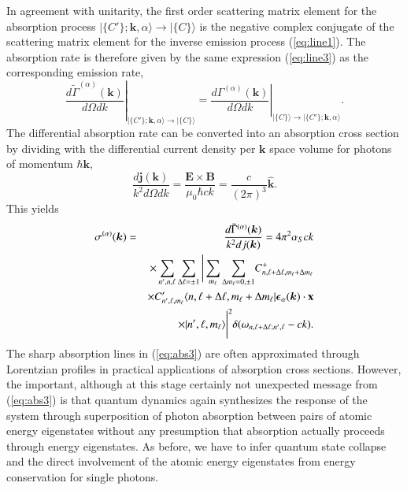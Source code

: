 \documentclass[final,3p,times,twocolumn]{elsarticle3}
\begin{document}
In agreement with unitarity, the first order scattering matrix element for the 
absorption process $\bm{|}\{C'\};\bm{k},\alpha\bm{\rangle}\to\bm{|}\{C\}\bm{\rangle}$
is the negative complex conjugate of the scattering matrix element for the 
inverse emission process (\ref{eq:line1}). The absorption rate is therefore 
given by the same expression (\ref{eq:line3}) as the corresponding emission rate,
\[
\left.\frac{d\tilde{\Gamma}^{(\alpha)}(\bm{k})}{d\Omega dk}
\right|_{\bm{|}\{C'\};\bm{k},\alpha\bm{\rangle}\to\bm{|}\{C\}\bm{\rangle}}
=\left.\frac{d\Gamma^{(\alpha)}(\bm{k})}{d\Omega dk}
\right|_{\bm{|}\{C\}\bm{\rangle}\to\bm{|}\{C'\};\bm{k},\alpha\bm{\rangle}}.
\]
The differential absorption rate can be converted into an absorption
cross section by dividing with the differential current
density per $\bm{k}$ space volume for photons of momentum $\hbar\bm{k}$,
\begin{equation}
\frac{d\bm{j}(\bm{k})}{k^2d\Omega dk}
=\frac{\bm{E}\times\bm{B}}{\mu_0\hbar ck}
=\frac{c}{(2\pi)^3}\hat{\bm{k}}.
\end{equation}
This yields
\begin{eqnarray} \nonumber
\sigma^{(\alpha)}(\bm{k})&=&\frac{d\tilde{\Gamma}^{(\alpha)}(\bm{k})}{k^2dj(\bm{k})}
=4\pi^2\alpha_S ck
\\ \nonumber
&&\times
\sum_{n',n,\ell}\sum_{\Delta\ell=\pm 1}\Bigg|
\sum_{m_\ell}\sum_{\Delta m_\ell=0,\pm 1}\!
C^+_{n,\ell+\Delta\ell,m_\ell+\Delta m_\ell}
\\ \nonumber
&&\times
C'_{n',\ell,m_\ell}\langle n,\ell+\Delta\ell,m_\ell+\Delta m_\ell|
\bm{\epsilon}_\alpha(\bm{k})\cdot\mathrm{\bf x}
\\ \label{eq:abs3}
&&\times
|n',\ell,m_\ell\rangle\Bigg|^2
\delta(\omega_{n,\ell+\Delta\ell;n',\ell}-ck).
\end{eqnarray}
The sharp absorption lines in (\ref{eq:abs3}) are often approximated 
through Lorentzian profiles in practical applications of absorption
cross sections.
However, the important, although at this stage certainly not unexpected
message from (\ref{eq:abs3}) is that quantum dynamics again synthesizes
the response of the system through superposition of photon absorption
between pairs of atomic energy eigenstates without any presumption that 
absorption actually proceeds through energy eigenstates. As before, we 
have to infer quantum state collapse and the direct involvement of the 
atomic energy eigenstates from energy conservation for single photons.
\end{document}
